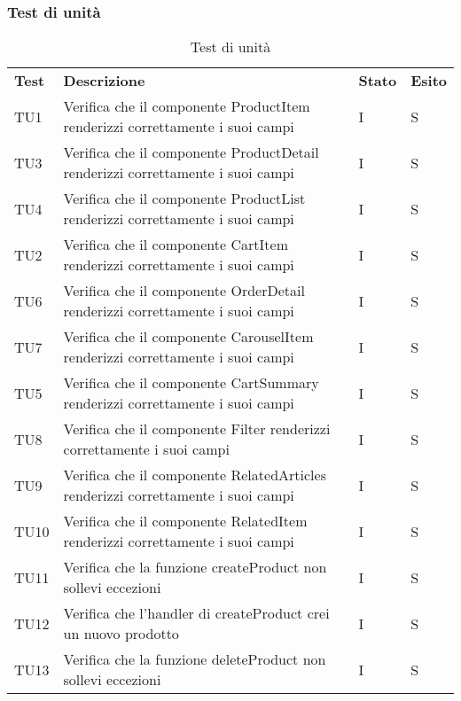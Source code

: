 \subsubsection{Test di unità}
\begin{center}
    \centering
    \renewcommand{\arraystretch}{1.8}
    \label{tab:TestUnita}
    \begin{longtable}[!h]{p{45px} p{255px} p{35px} p{35px}}
        \caption{Test di unità}                                                                                                                               \\
        \rowcolor{logo!70}
        \textbf{Test}   & \textbf{Descrizione}                                                                                & \textbf{Stato} & \textbf{Esito} \\
        TU1 & Verifica che il componente ProductItem renderizzi correttamente i suoi campi & I & S \\
        TU3 & Verifica che il componente ProductDetail renderizzi correttamente i suoi campi & I & S \\
        TU4 & Verifica che il componente ProductList renderizzi correttamente i suoi campi & I & S \\
        TU2 & Verifica che il componente CartItem renderizzi correttamente i suoi campi & I & S \\
        TU6 & Verifica che il componente OrderDetail renderizzi correttamente i suoi campi & I & S \\
        TU7 & Verifica che il componente CarouselItem renderizzi correttamente i suoi campi & I & S \\
        TU5 & Verifica che il componente CartSummary renderizzi correttamente i suoi campi & I & S \\
        TU8 & Verifica che il componente Filter renderizzi correttamente i suoi campi & I & S \\
        TU9 & Verifica che il componente RelatedArticles renderizzi correttamente i suoi campi & I & S \\
        TU10 & Verifica che il componente RelatedItem renderizzi correttamente i suoi campi & I & S \\
        TU11 & Verifica che la funzione createProduct non sollevi eccezioni & I & S \\
        TU12 & Verifica che l'handler di createProduct crei un nuovo prodotto & I & S \\
        TU13 & Verifica che la funzione deleteProduct non sollevi eccezioni & I & S \\

\end{longtable}
\end{center}
